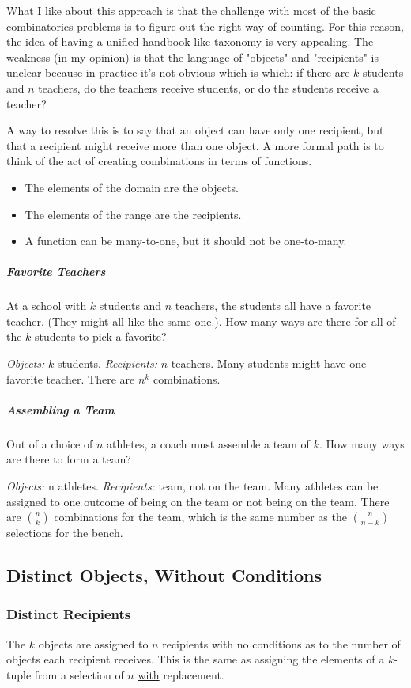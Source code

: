 What I like about this approach is that the challenge with most of the basic combinatorics problems is to figure out the right way of counting. For this reason, the idea of having a unified handbook-like taxonomy is very appealing. The weakness (in my opinion) is that the language of "objects" and "recipients" is unclear because in practice it's not obvious which is which: if there are $k$ students and $n$ teachers, do the teachers receive students, or do the students receive a teacher? 

A way to resolve this is to say that an object can have only one recipient, but that a recipient might receive more than one object. A more formal path is to think of the act of creating combinations in terms of functions. 

\begin{itemize}
\item The elements of the domain are the objects. 
\item The elements of the range are the recipients. 
\item A function can be many-to-one, but it should not be one-to-many. 
\end{itemize}

\subparagraph{Favorite Teachers} At a school with $k$ students and $n$ teachers, the students all have a favorite teacher. (They might all like the same one.). How many ways are there for all of the $k$ students to pick a favorite? 

\textit{Objects:} $k$ students. \textit{Recipients:} $n$ teachers. Many students might have one favorite teacher. There are $n^k$ combinations. 

\subparagraph{Assembling a Team} Out of a choice of $n$ athletes, a coach must assemble a team of $k$. How many ways are there to form a team? 

\textit{Objects:} n athletes. \textit{Recipients:} team, not on the team. Many athletes can be assigned to one outcome of being on the team or not being on the team. There are ${n \choose k}$ combinations for the team, which is the same number as the ${n \choose n-k}$ selections for the bench. 

\subsection{Distinct Objects, Without Conditions}

\subsubsection{Distinct Recipients}
The $k$ objects are assigned to $n$ recipients with no conditions as to the number of objects each recipient receives. This is the same as assigning the elements of a $k$-tuple from a selection of $n$ \underline{with} replacement.

